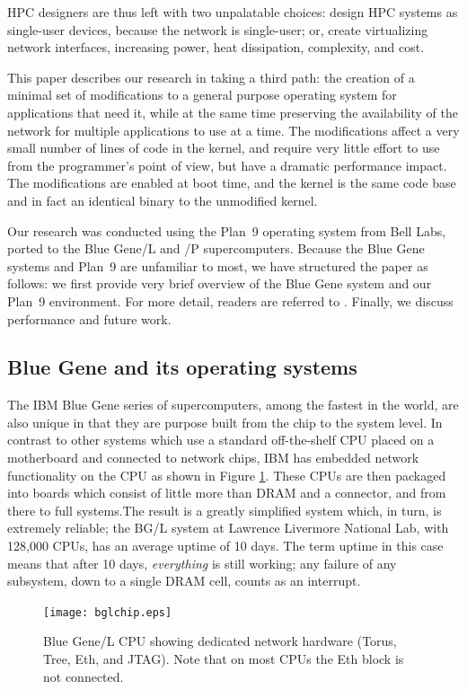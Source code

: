 \documentclass[letterpaper,twocolumn,10pt]{article}
\begin{document}
HPC designers are thus left with two unpalatable choices: design HPC systems as single-user devices, because the network is single-user; or, create virtualizing network interfaces, increasing power, heat dissipation, complexity, and cost. 

This paper describes our research in taking a third path: the creation of  a minimal set of modifications to a general purpose operating system for applications that need it, while at the same time preserving the availability of the network for multiple applications to use at a time. The modifications affect a very small number of lines of code in the kernel, and require very little 
effort to use from the programmer's point of view, but have a dramatic 
performance impact. The modifications are enabled at boot time, and the kernel is the same code base and in fact an identical binary to the unmodified kernel. 

Our research was conducted using the Plan~9 operating system from Bell Labs, ported to the Blue Gene/L and /P supercomputers. Because the Blue Gene systems and Plan~9 are unfamiliar to most, we have structured the paper as follows: we first provide very brief overview of the Blue Gene system and our Plan~9 environment. For more detail, readers are referred to \cite{plan9bgp}. 
Finally, we discuss performance and future work. 

\subsection{Blue Gene and its operating systems}
The IBM Blue Gene\cite{DBLP:journals/ibmrd/GaraBCCCGHHHKLOSTV05} series of supercomputers, among the fastest in the world, are also unique in that they are purpose built from the chip to the system level. In contrast to other systems which use a standard off-the-shelf CPU placed on a motherboard and connected to network chips, IBM has embedded network functionality on the CPU as shown in Figure \ref{bglchip}. These CPUs are then packaged into boards which consist of little more than DRAM and a connector, and from there to full systems.The result is a greatly simplified system which, in turn, is extremely reliable; the BG/L system at Lawrence Livermore National Lab, with 128,000 CPUs, has an average uptime of 10 days. The term uptime in this case means that after 10 days, {\em everything} is still working; any failure of any subsystem, down to a single DRAM cell, counts as an interrupt.
\begin{figure}
\texttt{[image: bglchip.eps]} 
\caption{\label{bglchip}Blue Gene/L CPU showing dedicated network hardware (Torus, Tree, Eth, and JTAG). Note that on most CPUs the Eth block is not connected.}
\end{figure}
\end{document}

